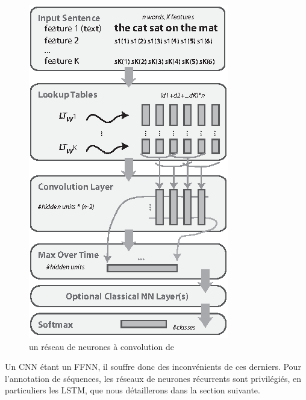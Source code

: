 \documentclass[PhD-Yoann-Dupont.tex]{subfiles}
\begin{document}
\begin{figure}[ht!]
\centering
\includegraphics[scale=1.25]{images/general/collobert2008}
\caption{un réseau de neurones à convolution de \citet{collobert2008unified}}
\label{fig:CNN-collobert2008}
\end{figure}

Un CNN étant un FFNN, il souffre donc des inconvénients de ces derniers. Pour l'annotation de séquences, les réseaux de neurones récurrents sont privilégiés, en particuliers les LSTM, que nous détaillerons dans la section suivante.
\end{document}
